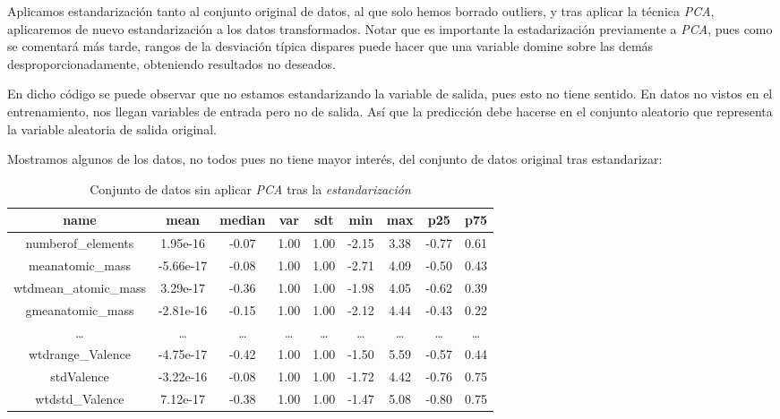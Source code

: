 \documentclass[11pt]{article}
\begin{document}
Aplicamos estandarización tanto al conjunto original de datos, al que solo hemos borrado outliers, y tras aplicar la técnica \emph{PCA}, aplicaremos de nuevo estandarización a los datos transformados. Notar que es importante la estadarización previamente a \emph{PCA}, pues como se comentará más tarde, rangos de la desviación típica dispares puede hacer que una variable domine sobre las demás desproporcionadamente, obteniendo resultados no deseados.

En dicho código se puede observar que no estamos estandarizando la variable de salida, pues esto no tiene sentido. En datos no vistos en el entrenamiento, nos llegan variables de entrada pero no de salida. Así que la predicción debe hacerse en el conjunto aleatorio que representa la variable aleatoria de salida original.

Mostramos algunos de los datos, no todos pues no tiene mayor interés, del conjunto de datos original tras estandarizar:

\begin{table}[H]
\centering
\begin{tabular}{|c|c|c|c|c|c|c|c|c|}
\hline
\textbf{name} &                                      \textbf{mean} &    \textbf{median} &       \textbf{var} &       \textbf{sdt} &       \textbf{min} &       \textbf{max} &       \textbf{p25} &       \textbf{p75} \\
\hline
numberof\_elements              &  1.95e-16& -0.07&  1.00&  1.00& -2.15&  3.38& -0.77&  0.61 \\
meanatomic\_mass                & -5.66e-17& -0.08&  1.00&  1.00& -2.71&  4.09& -0.50&  0.43 \\
wtdmean\_atomic\_mass            &  3.29e-17& -0.36&  1.00&  1.00& -1.98&  4.05& -0.62&  0.39 \\
gmeanatomic\_mass               & -2.81e-16& -0.15&  1.00&  1.00& -2.12&  4.44& -0.43&  0.22 \\
\ldots &  \ldots & \ldots & \ldots & \ldots &  \ldots & \ldots & \ldots & \ldots \\
wtdrange\_Valence               & -4.75e-17& -0.42&  1.00&  1.00& -1.50&  5.59& -0.57&  0.44 \\
stdValence                     & -3.22e-16& -0.08&  1.00&  1.00& -1.72&  4.42& -0.76&  0.75 \\
wtdstd\_Valence                 &  7.12e-17& -0.38&  1.00&  1.00& -1.47&  5.08& -0.80&  0.75 \\
\hline
    \end{tabular}
    \caption{Conjunto de datos sin aplicar \emph{PCA} tras la \emph{estandarización}}
    \label{tabla_sin_pca}
\end{table}
\end{document}
